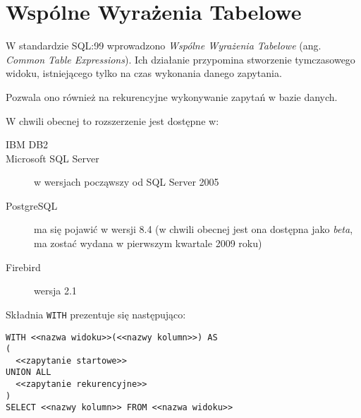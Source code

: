 \section{Wspólne Wyrażenia Tabelowe}





W standardzie SQL:99 wprowadzono \emph{Wspólne Wyrażenia Tabelowe} (ang. \emph{Common Table Expressions}).
Ich działanie przypomina stworzenie tymczasowego widoku, 
istniejącego tylko na czas wykonania danego zapytania.


Pozwala ono również na rekurencyjne wykonywanie zapytań w bazie danych.

W chwili obecnej to rozszerzenie jest dostępne w:
\begin{description}
 \item[IBM DB2]
 \item[Microsoft SQL Server]
	w wersjach począwszy od SQL Server 2005
 \item[PostgreSQL]
	ma się pojawić w wersji 8.4 (w chwili obecnej jest ona dostępna jako \emph{beta}, ma zostać wydana w pierwszym kwartale 2009 roku)
 \item[Firebird]
	wersja 2.1 
\end{description}

Składnia \texttt{WITH} prezentuje się następująco:

\begin{verbatim}
WITH <<nazwa widoku>>(<<nazwy kolumn>>) AS
(
  <<zapytanie startowe>>
UNION ALL
  <<zapytanie rekurencyjne>>
)
SELECT <<nazwy kolumn>> FROM <<nazwa widoku>>
\end{verbatim}

